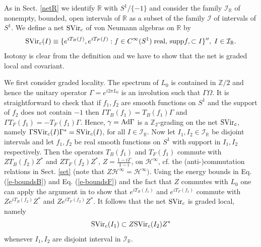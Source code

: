 \documentclass[11pt]{article}
\def\I{{\cal I}}
\def\H{{\cal H}}
\def\RR{{\mathbb R}}
\def\ZZ{{\mathbb Z}}
\def\H{{\mathcal H}}
\def\I{{\mathcal I}}
\begin{document}
As in Sect. \ref{netR} we identify $\mathbb R$ with $S^1/ \{-1\}$ and
consider the family $\I_{\mathbb R}$ of nonempty, bounded, open intervals of
${\mathbb R}$ as a subset of the family $\I$ of intervals of $S^1$. We define
a net ${\rm SVir}_{c}$ of von Neumann algebras on $\RR$ by 
\begin{equation}
\label{gener1} 
{\rm SVir}_{c}(I) \equiv \{ e^{iT_B(f)}, e^{iT_F(f)}:f\in C^{\infty}(S^1) 
\;{\rm real},\, {\rm supp}f, \subset I\}'', \; I \in \I_\RR. 
\end{equation} 
Isotony is clear from the definition and we have to show that the net is graded 
local and covariant.  

We first consider graded locality. The spectrum of $L_0$ is 
contained in $\ZZ/2$ and hence the unitary operator $\Gamma = e^{i2\pi L_0}$ 
is an involution such that $\Gamma \Omega$.  
It is straightforward to check that if $f_1, f_2$ 
are smooth functions on $S^1$ and the support of $f_2$ does not contain $-1$ 
then $\Gamma T_B(f_1) = T_B(f_1)\Gamma$ and 
$\Gamma T_F(f_1) = -T_F(f_1) \Gamma$.  
Hence, $\gamma = {\rm Ad}\Gamma$ is a $\ZZ_2$-grading on the net 
${\rm SVir}_{c}$, namely 
$\Gamma {\rm SVir}_{c}(I) \Gamma^* ={\rm SVir}_{c}(I)$, for all $I\in 
\I_\RR$. Now let $I_1, I_2 \in \I_\RR$ be disjoint intervals and 
let $f_1, f_2$ be real smooth functions on $S^1$ with support in $I_1, 
I_2$ respectively. Then the operators $T_B(f_1)$ and $T_F(f_1)$ commute
with $ZT_B(f_2)Z^*$ and $ZT_F(f_2)Z^*$, $Z=\frac{1-i\Gamma}{1-i}$, on 
$\H^\infty$, cf. the (anti-)commutation relations in Sect. \ref{set}
(note that $Z\H^\infty=\H^\infty)$. Using the energy  bounds in 
Eq. (\ref{e-boundsB}) and Eq. (\ref{e-boundsF}) and the fact that 
$Z$ commutes with $L_0$ one can apply the argument in 
\cite[Sect. 2]{BS-M} to show that $e^{iT_B(f_1)}$ and $e^{iT_F(f_1)}$ 
commute with $Ze^{iT_B(f_2)}Z^*$ and $Ze^{iT_F(f_2)}Z^*$. It follows that
the net ${\rm SVir}_c$ is graded local, namely 
\begin{equation} 
{\rm SVir}_c(I_1) \subset Z{\rm SVir}_c(I_2)Z^*
\end{equation}  
whenever $I_1, I_2$ are disjoint interval in $\I_\RR$. 
\end{document}
